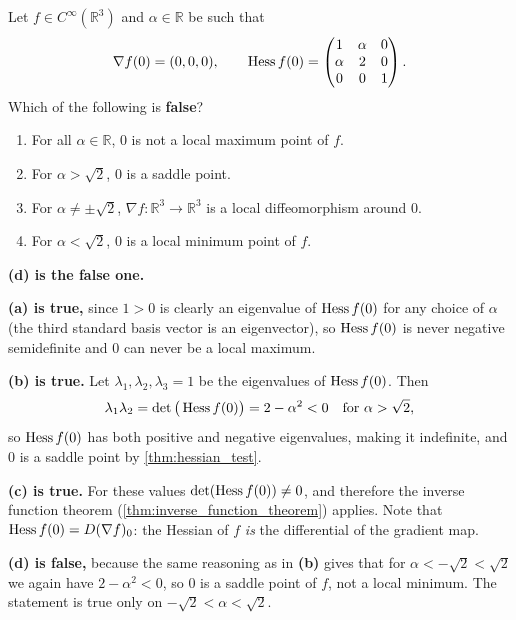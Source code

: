 \begin{question}
\label{q:quiz_q5}
Let $f \in C^\infty(\mathbb{R}^3)$ and $\alpha \in \mathbb{R}$ be such that
\[\nabla f(0) = (0,0,0), \qquad
\operatorname{Hess} f(0) = \begin{pmatrix} 1 & \alpha & 0 \\ \alpha & 2 & 0 \\ 0 & 0 & 1\end{pmatrix}.\]
Which of the following is \textbf{false}?
\begin{enumerate}[label=\textbf{(\alph*)}]
  \item For all $\alpha \in \mathbb{R}$, $0$ is not a local maximum point of $f$.
  \item For $\alpha > \sqrt2$, $0$ is a saddle point.
  \item For $\alpha \neq \pm\sqrt2$, $\nabla f : \mathbb{R}^3 \to \mathbb{R}^3$ is a local
    diffeomorphism around $0$.
  \item For $\alpha < \sqrt2$, $0$ is a local minimum point of $f$.
\end{enumerate}
\end{question}

\begin{answer}
\textbf{(d) is the false one.}

\textbf{(a) is true,} since $1 > 0$ is clearly an eigenvalue of $\operatorname{Hess} f(0)$ for any choice of
$\alpha$ (the third standard basis vector is an eigenvector), so $\operatorname{Hess} f(0)$ is never negative
semidefinite and $0$ can never be a local maximum.

\textbf{(b) is true.} Let $\lambda_1,\lambda_2,\lambda_3 = 1$ be the eigenvalues of
$\operatorname{Hess} f(0)$. Then
\[\lambda_1\lambda_2 = \det\big(\operatorname{Hess} f(0)\big) = 2-\alpha^2 < 0 \quad \text{for } \alpha > \sqrt2,\]
so $\operatorname{Hess} f(0)$ has both positive and negative eigenvalues, making it indefinite, and $0$ is a
saddle point by \cref{thm:hessian_test}.

\textbf{(c) is true.} For these values $\det(\operatorname{Hess} f(0)) \neq 0$, and therefore the inverse
function theorem (\cref{thm:inverse_function_theorem}) applies. Note that
$\operatorname{Hess} f(0) = D(\nabla f)_0$: the Hessian of $f$ \emph{is} the differential of the gradient map.

\textbf{(d) is false,} because the same reasoning as in \textbf{(b)} gives that for
$\alpha < -\sqrt2 < \sqrt2$ we again have $2-\alpha^2 < 0$, so $0$ is a saddle point of $f$, not
a local minimum. The statement is true only on $-\sqrt2 < \alpha < \sqrt2$.
\end{answer}

